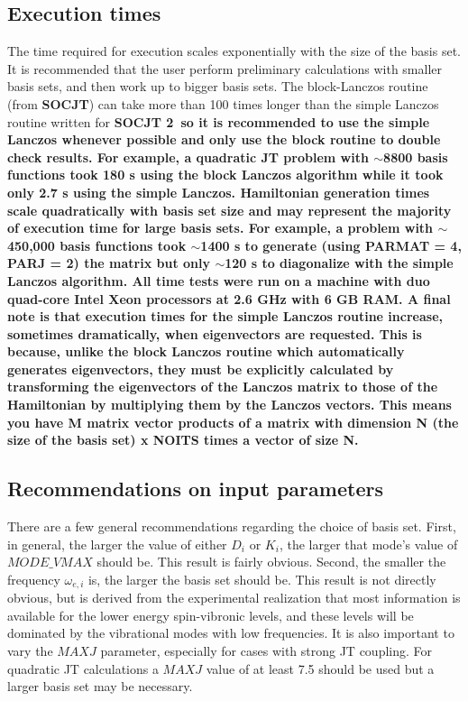 \documentclass{article}
\newcommand{\socjttwo}{\bf{SOCJT 2}}
\newcommand{\socjt}{{\bf SOCJT}}
\begin{document}
\subsection{Execution times}
The time required for execution scales exponentially with the size of
the basis set. It is recommended that the user perform preliminary
calculations with smaller basis sets, and then work up to bigger basis
sets. The block-Lanczos routine (from \socjt) can take more than 100
times longer than the simple Lanczos routine written for \socjttwo\ so
it is recommended to use the simple Lanczos whenever possible and only
use the block routine to double check results. For example, a quadratic JT problem with $\sim$8800 basis functions took 180 s using the block Lanczos 
algorithm while it took only 2.7 s using the simple Lanczos. Hamiltonian
generation times scale quadratically with basis set size and may represent
the majority of execution time for large basis sets. For example, a problem with $\sim$450,000 basis functions took $\sim$1400 s to generate (using PARMAT = 4, PARJ = 2) the matrix but only $\sim$120 s to diagonalize with the simple Lanczos algorithm. All time tests were run on a machine with duo quad-core Intel Xeon processors at 2.6 GHz with 6 GB RAM. A final note is that execution times for the simple Lanczos routine increase, sometimes dramatically, when eigenvectors are requested. This is because, unlike the block Lanczos routine which automatically generates eigenvectors, they must be explicitly calculated by transforming the eigenvectors of the Lanczos matrix to those of the Hamiltonian by multiplying them by the Lanczos vectors. This means you have M matrix vector products of a matrix with dimension N (the size of the basis set) x NOITS times a vector of size N. 

\subsection{Recommendations on input parameters}
There are a few general recommendations regarding the choice of basis
set. First, in general, the larger the value of either $D_i$ or $K_i$,
the larger that mode's value of $MODE\_VMAX$ should be. This result is
fairly obvious. Second, the smaller the frequency $\omega _{e,i}$ is,
the larger the basis set should be. This result is not directly
obvious, but is derived from the experimental realization that most
information is available for the lower energy spin-vibronic levels,
and these levels will be dominated by the vibrational modes with low
frequencies. It is also important to vary the $MAXJ$ parameter, especially
for cases with strong JT coupling. For quadratic JT calculations a $MAXJ$
value of at least 7.5 should be used but a larger basis set may
be necessary.
\end{document}
